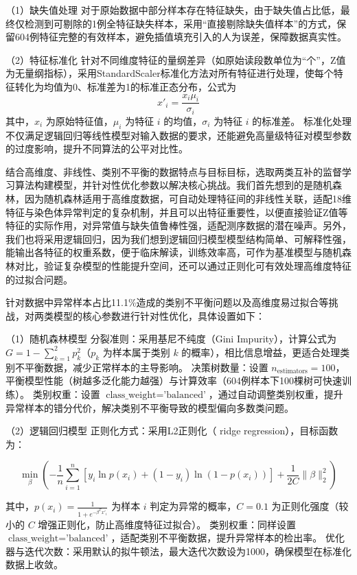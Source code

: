 \documentclass[withoutpreface,bwprint]{cumcmthesis} %
\begin{document}
（1）缺失值处理  
对于原始数据中部分样本存在特征缺失，由于缺失值占比低，最终仅检测到可剔除的1例全特征缺失样本，采用“直接剔除缺失值样本”的方式，保留604例特征完整的有效样本，避免插值填充引入的人为误差，保障数据真实性。  

（2）特征标准化  
针对不同维度特征的量纲差异（如原始读段数单位为“个”，Z值为无量纲指标），采用StandardScaler标准化方法对所有特征进行处理，使每个特征转化为均值为0、标准差为1的标准正态分布，公式为
\begin{equation}
x'_i = \frac{x_{i} \mu_i}{\sigma_i}
\end{equation}
其中，$ x_i $ 为原始特征值，$ \mu_i $ 为特征 $ i $ 的均值，$ \sigma_i $ 为特征 $ i $ 的标准差。  
标准化处理不仅满足逻辑回归等线性模型对输入数据的要求，还能避免高量级特征对模型参数的过度影响，提升不同算法的公平对比性。

结合高维度、非线性、类别不平衡的数据特点与目标目标，选取两类互补的监督学习算法构建模型，并针对性优化参数以解决核心挑战。我们首先想到的是随机森林，因为随机森林适用于高维度数据，可自动处理特征间的非线性关联，适配18维特征与染色体异常判定的复杂机制，并且可以出特征重要性，以便直接验证Z值等特征的实际作用，对异常值与缺失值鲁棒性强，适配测序数据的潜在噪声。另外，我们也将采用逻辑回归，因为我们想到逻辑回归模型模型结构简单、可解释性强，能输出各特征的权重系数，便于临床解读，训练效率高，可作为基准模型与随机森林对比，验证复杂模型的性能提升空间，还可以通过正则化可有效处理高维度特征的过拟合问题。

针对数据中异常样本占比11.1\%造成的类别不平衡问题以及高维度易过拟合等挑战，对两类模型的核心参数进行针对性优化，具体设置如下：

（1）随机森林模型
分裂准则：采用基尼不纯度（Gini Impurity），计算公式为 $ G = 1 - \sum_{k=1}^2 p_k^2 $（$ p_k $ 为样本属于类别 $ k $ 的概率），相比信息增益，更适合处理类别不平衡数据，减少正常样本的主导影响。  
决策树数量：设置 $ n_{\text{estimators}} = 100 $，平衡模型性能（树越多泛化能力越强）与计算效率（604例样本下100棵树可快速训练）。  
类别权重：设置 $ \text{class\_weight} = \text{'balanced'} $，通过自动调整类别权重，提升异常样本的错分代价，解决类别不平衡导致的模型偏向多数类问题。  

（2）逻辑回归模型
正则化方式：采用L2正则化（ ridge regression），目标函数为：  

\begin{equation}
\min_{\beta} \left( -\frac{1}{n} \sum_{i=1}^n [y_i \ln p(x_i) + (1-y_i) \ln (1-p(x_i))] + \frac{1}{2C} \|\beta\|_2^2 \right)
\end{equation}


其中，$ p(x_i) = \frac{1}{1+e^{-\beta^T x'_i}} $ 为样本 $ i $ 判定为异常的概率，$ C = 0.1 $ 为正则化强度（较小的 $ C $ 增强正则化，防止高维度特征过拟合）。  
类别权重：同样设置 $ \text{class\_weight} = \text{'balanced'} $，适配类别不平衡数据，提升异常样本的检出率。  
优化器与迭代次数：采用默认的拟牛顿法，最大迭代次数设为1000，确保模型在标准化数据上收敛。
\end{document}
